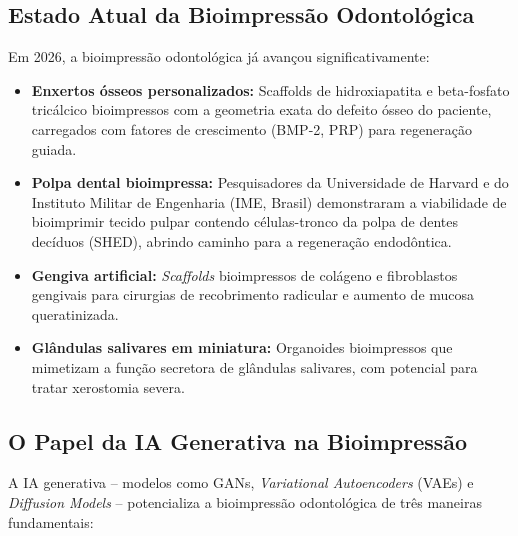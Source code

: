 \subsection{Estado Atual da Bioimpressão Odontológica}

Em 2026, a bioimpressão odontológica já avançou significativamente:

\begin{itemize}
  \item \textbf{Enxertos ósseos personalizados:} Scaffolds de hidroxiapatita e
    beta-fosfato tricálcico bioimpressos com a geometria exata do defeito ósseo
    do paciente, carregados com fatores de crescimento (BMP-2, PRP) para
    regeneração guiada.

  \item \textbf{Polpa dental bioimpressa:} Pesquisadores da Universidade de
    Harvard e do Instituto Militar de Engenharia (IME, Brasil) demonstraram a
    viabilidade de bioimprimir tecido pulpar contendo células-tronco da polpa
    de dentes decíduos (SHED), abrindo caminho para a regeneração endodôntica.

  \item \textbf{Gengiva artificial:} \textit{Scaffolds} bioimpressos de
    colágeno e fibroblastos gengivais para cirurgias de recobrimento radicular
    e aumento de mucosa queratinizada.

  \item \textbf{Glândulas salivares em miniatura:} Organoides bioimpressos que
    mimetizam a função secretora de glândulas salivares, com potencial para
    tratar xerostomia severa.
\end{itemize}

\subsection{O Papel da IA Generativa na Bioimpressão}

A IA generativa -- modelos como GANs, \textit{Variational Autoencoders} (VAEs)
e \textit{Diffusion Models} -- potencializa a bioimpressão odontológica de três
maneiras fundamentais:

